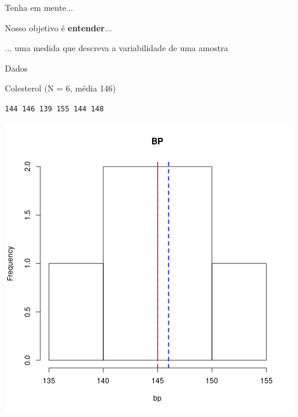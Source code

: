\documentclass{beamer}
\begin{document}
\begin{frame}{\scriptsize Tenha em mente...}
  \begin{center}
    Nosso objetivo é {\bf entender}...

    \bigskip
    ... uma medida que descreva a variabilidade de uma amostra
  \end{center}
\end{frame}

\begin{frame}[fragile]{\scriptsize Dados}
  \begin{exampleblock}{\scriptsize Colesterol (N = 6, média 146)}
    \begin{center}
    \tiny
\begin{verbatim}
144 146 139 155 144 148
\end{verbatim}
    \bigskip
    \includegraphics[height=.5\textheight]{Cap3/histograma-bp}
  \end{center}
\end{exampleblock}
\end{frame}
\end{document}
